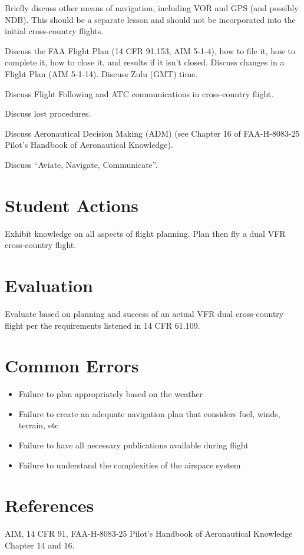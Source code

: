 Briefly discuss other means of navigation, including VOR and GPS (and possibly
NDB). This should be a separate lesson and should not be incorporated into the
initial cross-country flights.

Discuss the FAA Flight Plan (14 CFR 91.153, AIM 5-1-4), how to file it, how to
complete it, how to close it, and results if it isn’t closed. Discuss changes
in a Flight Plan (AIM 5-1-14). Discuss Zulu (GMT) time.

Discuss Flight Following and ATC communications in cross-country flight.

Discuss lost procedures.

Discuss Aeronautical Decision Making (ADM) (see Chapter 16 of FAA-H-8083-25
Pilot's Handbook of Aeronautical Knowledge).

Discuss ``Aviate, Navigate, Communicate''.

\section{Student Actions}

Exhibit knowledge on all aspects of flight planning. Plan then fly a dual VFR
cross-country flight.

\section{Evaluation}

Evaluate based on planning and success of an actual VFR dual cross-country
flight per the requirements listened in 14 CFR 61.109.

\section{Common Errors}

\begin{itemize}
  \item Failure to plan appropriately based on the weather
  \item Failure to create an adequate navigation plan that considers fuel,
    winds, terrain, etc
  \item Failure to have all necessary publications available during flight
  \item Failure to understand the complexities of the airspace system
\end{itemize}

\section{References}

AIM, 14 CFR 91, FAA-H-8083-25 Pilot's Handbook of Aeronautical Knowledge
Chapter 14 and 16.

